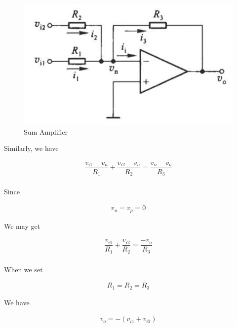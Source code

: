 \begin{figure}[H]
  \centering
  \includegraphics[width=0.5\linewidth]{figures/sum-amplifier}
  \caption{Sum Amplifier}
  \label{fig:}
\end{figure}

Similarly, we have

\begin{equation*}
  \begin{aligned}
    \dfrac{v_{i1} - v_n}{R_1} + \dfrac{v_{i2}- v_n}{R_2} = \dfrac{v_n - v_o}{R_3} \\
  \end{aligned}
\end{equation*}

Since

\begin{equation*}
  \begin{aligned}
    v_n= v_p = 0
  \end{aligned}
\end{equation*}

We may get

\begin{equation*}
  \begin{aligned}
    \dfrac{v_{i1}}{R_1} + \dfrac{v_{i2}}{R_2} = \dfrac{- v_o}{R_3} \\
  \end{aligned}
\end{equation*}

When we set

\begin{equation*}
  \begin{aligned}
    R_1 = R_2 = R_3
  \end{aligned}
\end{equation*}

We have

\begin{equation*}
  \begin{aligned}
    v_o = - \left( v_{i1} + v_{i2} \right)
  \end{aligned}
\end{equation*}


